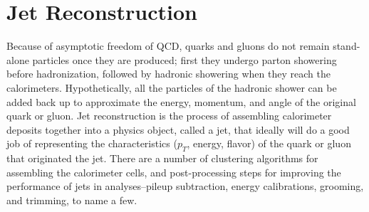 %



\section{Jet Reconstruction}
\label{sec:jet_reco}
Because of asymptotic freedom of QCD, quarks and gluons do not remain stand-alone particles once they are produced;
first they undergo parton showering before hadronization, followed by hadronic showering 
when they reach the calorimeters. 
Hypothetically, all the particles of 
the hadronic shower can be added back up to approximate the energy, momentum, and angle of the original quark 
or gluon.  Jet reconstruction is the process of assembling calorimeter deposits together into a physics object, called a 
jet, that ideally will do a good job of representing the characteristics ($p_T$, energy, 
flavor) of the quark or gluon that originated the jet.  There are a number of clustering algorithms for 
assembling the calorimeter cells, and post-processing steps for improving the performance of jets in analyses--pileup 
subtraction, energy calibrations, grooming, and trimming, to name a few.  

